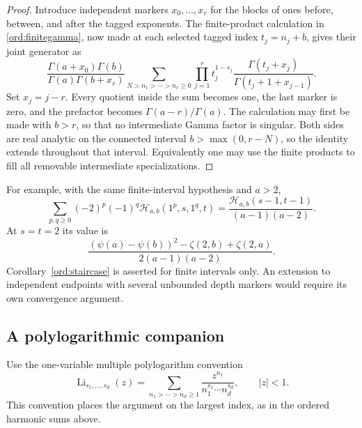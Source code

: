 \documentclass[11pt,a4paper]{article}
\numberwithin{equation}{section}
\theoremstyle{definition}
\theoremstyle{remark}
\DeclareMathOperator{\Li}{Li}
\newcommand{\Hrel}{\mathcal H}
\begin{document}
\begin{proof}
Introduce independent markers $x_0,\ldots,x_r$ for the blocks of ones
before, between, and after the tagged exponents.  The finite-product
calculation in \eqref{ord:finitegamma}, now made at each selected
tagged index $t_j=n_j+b$, gives their joint generator as
\[
 \frac{\Gamma(a+x_0)\Gamma(b)}
      {\Gamma(a)\Gamma(b+x_r)}
 \sum_{N>n_1>\cdots>n_r\ge0}
       \prod_{j=1}^r
           t_j^{1-s_j}
           \frac{\Gamma(t_j+x_j)}
                {\Gamma(t_j+1+x_{j-1})}.
\]
Set $x_j=j-r$.  Every quotient inside the sum becomes one, the last
marker is zero, and the prefactor becomes $\Gamma(a-r)/\Gamma(a)$.
The calculation may first be made with $b>r$, so that no intermediate
Gamma factor is singular.  Both sides are real analytic on the
connected interval $b>\max(0,r-N)$, so the identity extends throughout
that interval.  Equivalently one may use the finite products to fill
all removable intermediate specializations.
\end{proof}

For example, with the same finite-interval hypothesis and $a>2$,
\[
 \sum_{p,q\ge0}(-2)^p(-1)^q
          \Hrel_{a,b}(1^p,s,1^q,t)
       =\frac{\Hrel_{a,b}(s-1,t-1)}{(a-1)(a-2)}.
\]
At $s=t=2$ its value is
\[
 \frac{(\psi(a)-\psi(b))^2-\zeta(2,b)+\zeta(2,a)}
           {2(a-1)(a-2)}.
\]
Corollary~\ref{ord:staircase} is asserted for finite intervals only.
An extension to independent endpoints with several unbounded depth
markers would require its own convergence argument.

\subsection{A polylogarithmic companion}

Use the one-variable multiple polylogarithm convention
\[
 \Li_{s_1,\ldots,s_d}(z)
    =\sum_{n_1>\cdots>n_d\ge1}
        \frac{z^{n_1}}{n_1^{s_1}\cdots n_d^{s_d}},
 \qquad |z|<1.
\]
This convention places the argument on the largest index, as in the
ordered harmonic sums above.
\end{document}
